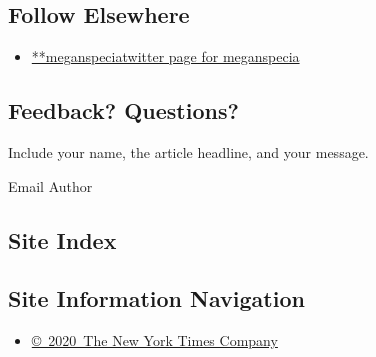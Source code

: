 \hypertarget{follow-elsewhere}{%
\subsection{Follow Elsewhere}\label{follow-elsewhere}}

\begin{itemize}
\tightlist
\item
  \href{https://twitter.com/meganspecia}{**meganspeciatwitter page for
  meganspecia}
\end{itemize}

\hypertarget{feedback-questions}{%
\subsection{Feedback? Questions?}\label{feedback-questions}}

Include your name, the article headline, and your message.

Email Author

\hypertarget{site-index}{%
\subsection{Site Index}\label{site-index}}

\hypertarget{site-information-navigation}{%
\subsection{Site Information
Navigation}\label{site-information-navigation}}

\begin{itemize}
\tightlist
\item
  \href{https://help.nytimes3xbfgragh.onion/hc/en-us/articles/115014792127-Copyright-notice}{©~2020~The
  New York Times Company}
\end{itemize}

